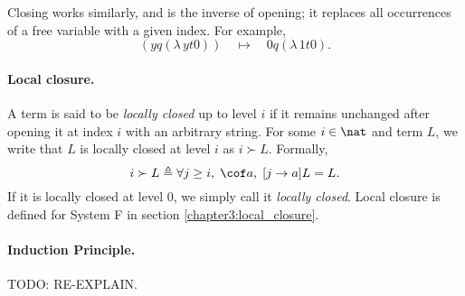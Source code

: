 Closing works similarly, and is the inverse of opening; it replaces all occurrences of a free
variable with a given index. For example,
\begin{equation*}
  [0 \leftarrow y] (y q (\lambda \, y t 0)) \quad \mapsto \quad 0 q (\lambda \, 1 t 0).
\end{equation*}

\paragraph*{Local closure.} A term is said to be \textit{locally closed} up to level $i$ if it
remains unchanged after opening it at index $i$ with an arbitrary string. For some $i \in \nat$ and
term $L$, we write that $L$ is locally closed at level $i$ as $i \succ L$. Formally,
\begin{equation}
  \label{equation:local_closure}
  i \succ L \triangleq \forall j \geq i, \; \cof a , \; [j \to a] L = L.
\end{equation}
If it is locally closed at level $0$, we simply call it \textit{locally closed}. Local closure is
defined for System F in section \ref{chapter3:local_closure}.

\paragraph*{Induction Principle.} TODO: RE-EXPLAIN.
